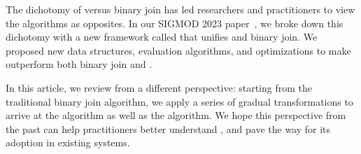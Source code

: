 The dichotomy of \WCOJ versus binary join has led researchers
and practitioners to view the algorithms as opposites.
In our SIGMOD 2023 paper~\cite{10.1145/3589295},
we broke down this dichotomy with a new framework called \FJ
that unifies \WCOJ and binary join.
We proposed new data structures, evaluation algorithms,
and optimizations to make \FJ outperform both binary join and \WCOJ.

In this article, we review \FJ from a different perspective:
starting from the traditional binary join algorithm,
we apply a series of gradual transformations
to arrive at the \FJ algorithm as well as the \WCOJ algorithm.
We hope this perspective from the past can help practitioners
better understand \FJ,
and pave the way for its adoption in existing systems.




